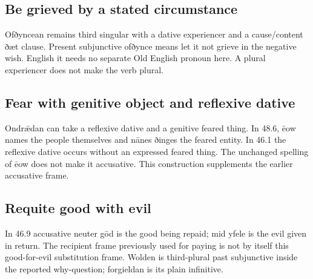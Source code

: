 \subsection*{Be grieved by a stated circumstance}

Ofðyncean remains third singular with a dative experiencer and a cause/\allowbreak{}content ðæt clause. Present subjunctive ofðynce means let it not grieve in the negative wish. English it needs no separate Old English pronoun here. A plural experiencer does not make the verb plural.

\subsection*{Fear with genitive object and reflexive dative}

Ondrǣdan can take a reflexive dative and a genitive feared thing. In 48.6, ēow names the people themselves and nānes ðinges the feared entity. In 46.1 the reflexive dative occurs without an expressed feared thing. The unchanged spelling of ēow does not make it accusative. This construction supplements the earlier accusative frame.

\subsection*{Requite good with evil}

In 46.9 accusative neuter gōd is the good being repaid; mid yfele is the evil given in return. The recipient frame previously used for paying is not by itself this good-for-evil substitution frame. Wolden is third-plural past subjunctive inside the reported why-question; forgieldan is its plain infinitive.

